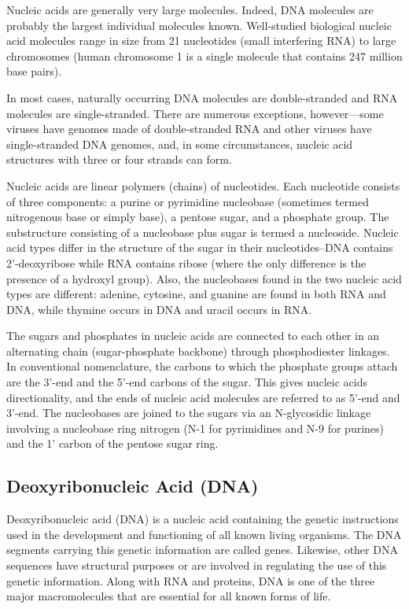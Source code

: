 Nucleic acids are generally very large molecules. Indeed, DNA molecules are probably the largest individual molecules known. Well-studied biological nucleic acid molecules range in size from 21 nucleotides (small interfering RNA) to large chromosomes (human chromosome 1 is a single molecule that contains 247 million base pairs).

In most cases, naturally occurring DNA molecules are double-stranded and RNA molecules are single-stranded. There are numerous exceptions, however---some viruses have genomes made of double-stranded RNA and other viruses have single-stranded DNA genomes, and, in some circumstances, nucleic acid structures with three or four strands can form.

Nucleic acids are linear polymers (chains) of nucleotides. Each nucleotide consists of three components: a purine or pyrimidine nucleobase (sometimes termed nitrogenous base or simply base), a pentose sugar, and a phosphate group. The substructure consisting of a nucleobase plus sugar is termed a nucleoside. Nucleic acid types differ in the structure of the sugar in their nucleotides--DNA contains 2'-deoxyribose while RNA contains ribose (where the only difference is the presence of a hydroxyl group). Also, the nucleobases found in the two nucleic acid types are different: adenine, cytosine, and guanine are found in both RNA and DNA, while thymine occurs in DNA and uracil occurs in RNA.

The sugars and phosphates in nucleic acids are connected to each other in an alternating chain (sugar-phosphate backbone) through phosphodiester linkages. In conventional nomenclature, the carbons to which the phosphate groups attach are the 3'-end and the 5'-end carbons of the sugar. This gives nucleic acids directionality, and the ends of nucleic acid molecules are referred to as 5'-end and 3'-end. The nucleobases are joined to the sugars via an N-glycosidic linkage involving a nucleobase ring nitrogen (N-1 for pyrimidines and N-9 for purines) and the 1' carbon of the pentose sugar ring.

\hypertarget{deoxyribonucleic-acid-dna}{%
\subsection{Deoxyribonucleic Acid (DNA)}\label{deoxyribonucleic-acid-dna}}

Deoxyribonucleic acid (DNA) is a nucleic acid containing the genetic instructions used in the development and functioning of all known living organisms. The DNA segments carrying this genetic information are called genes. Likewise, other DNA sequences have structural purposes or are involved in regulating the use of this genetic information. Along with RNA and proteins, DNA is one of the three major macromolecules that are essential for all known forms of life.

